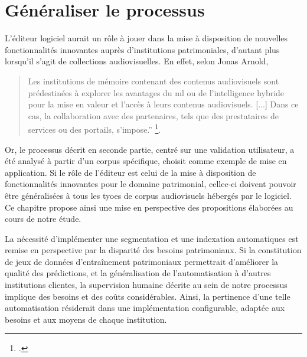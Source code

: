 \chapter{\label{III_3} Généraliser le processus} 

L'éditeur logiciel aurait un rôle à jouer dans la mise à disposition de nouvelles fonctionnalités innovantes auprès d'institutions patrimoniales, d'autant plus lorsqu'il s'agit de collections audiovisuelles. En effet, selon Jonas Arnold, 

\begin{quote}
	Les institutions de mémoire contenant des contenus audiovisuels sont prédestinées à explorer les avantages du \gls{ml} ou de l'intelligence hybride pour la mise en valeur et l'accès à leurs contenus audiovisuels. [...] Dans ce cas, la collaboration avec des partenaires, tels que des prestataires de services ou des portails, s'impose.” \footcite{zotero-item-584}. 
\end{quote}

Or, le processus décrit en seconde partie, centré sur une validation utilisateur, a été analysé à partir d'un corpus spécifique, choisit comme exemple de mise en application. Si le rôle de l'éditeur est celui de la mise à disposition de fonctionnalités innovantes pour le domaine patrimonial, cellec-ci doivent pouvoir être généralisées à tous les tyoes de corpus audiovisuels hébergés par le logiciel. Ce chapitre propose ainsi une mise en perspective des propositions élaborées au cours de notre étude.









La nécessité d'implémenter une segmentation et une indexation automatiques est remise en perspective par la disparité des besoins patrimoniaux. Si la constitution de jeux de données d'entraînement patrimoniaux permettrait d'améliorer la qualité des prédictions, et la généralisation de l'automatisation à d'autres institutions clientes, la supervision humaine décrite au sein de notre processus implique des besoins et des coûts considérables. 
Ainsi, la pertinence d'une telle automatisation résiderait dans une implémentation configurable, adaptée aux besoins et aux moyens de chaque institution.

\clearpage

